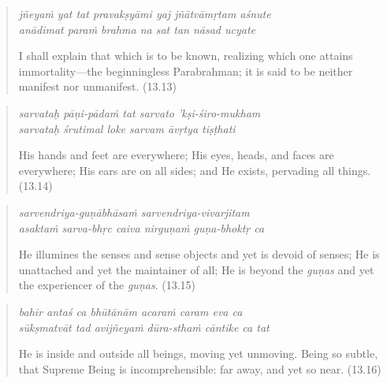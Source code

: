 \documentclass[12pt, twoside, openright]{memoir}
\begin{document}
\par
\begin{verse}
\textit{jñeyaṁ yat tat pravakṣyāmi yaj jñātvāmṛtam aśnute} \\
\textit{anādimat paraṁ brahma na sat tan nāsad ucyate}

\noindent I shall explain that which is to be known, realizing which one attains immortality---the beginningless Parabrahman; it is said to be neither manifest nor unmanifest. (13.13)
\end{verse}
\par



\par
\begin{verse}
\textit{sarvataḥ pāṇi-pādaṁ tat sarvato ’kṣi-śiro-mukham} \\
\textit{sarvataḥ śrutimal loke sarvam āvṛtya tiṣṭhati}

\noindent His hands and feet are everywhere; His eyes, heads, and faces are everywhere; His ears are on all sides; and He exists, pervading all things. (13.14)
\end{verse}
\par



\par
\begin{verse}
\textit{sarvendriya-guṇābhāsaṁ sarvendriya-vivarjitam} \\
\textit{asaktaṁ sarva-bhṛc caiva nirguṇaṁ guṇa-bhoktṛ ca}

\noindent He illumines the senses and sense objects and yet is devoid of senses; He is unattached and yet the maintainer of all; He is beyond the \textit{guṇas} and yet the experiencer of the \textit{guṇas}. (13.15)
\end{verse}
\par



\par
\begin{verse}
\textit{bahir antaś ca bhūtānām acaraṁ caram eva ca} \\
\textit{sūkṣmatvāt tad avijñeyaṁ dūra-sthaṁ cāntike ca tat}

\noindent He is inside and outside all beings, moving yet unmoving. Being so subtle, that Supreme Being is incomprehensible: far away, and yet so near. (13.16)
\end{verse}
\par
\end{document}
